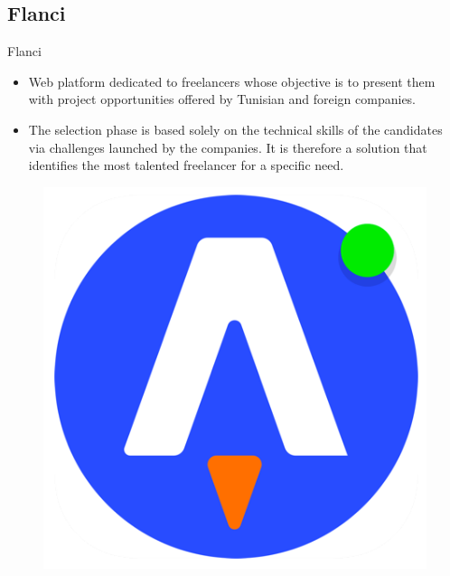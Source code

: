 \subsection{Flanci}
\begin{frame}{Flanci}
\hspace{-0.5cm}
\begin{minipage}{0.79\linewidth}
 \renewcommand{\raggedright}{\leftskip=0pt \rightskip=0pt plus 0cm}
    \begin{itemize}\itemsep1em
    \item Web platform dedicated to freelancers whose objective is to present them with project opportunities offered by Tunisian and foreign companies.
    \item  The selection phase is based solely on the technical skills of the candidates via challenges launched by the companies. It is therefore a solution that identifies the most talented freelancer for a specific need.
\end{itemize}
\end{minipage}
\hspace{0.1cm}
\begin{minipage}{0.2\linewidth}
\begin{figure}
    \centering
    \includegraphics[scale=0.22]{figures/flanci.png}
\end{figure}
\end{minipage}
\end{frame}

\begin{frame}
\end{frame}